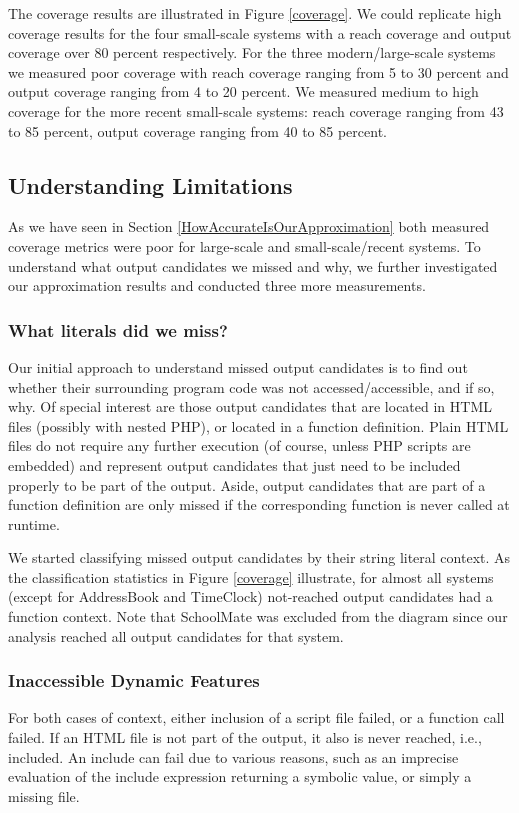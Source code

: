 \documentclass[sigconf]{acmart}
\begin{document}
The coverage results are illustrated in Figure \ref{coverage}. We could
replicate high coverage results for the four small-scale systems with a reach
coverage and output coverage over 80 percent respectively. For the three
modern/large-scale systems we measured poor coverage with reach coverage
ranging from 5 to 30 percent and output coverage ranging from 4 to 20 percent.
We measured medium to high coverage for the more recent small-scale systems:
reach coverage ranging from 43 to 85 percent, output coverage ranging from 40
to 85 percent.

\subsection{Understanding Limitations}
As we have seen in Section \ref{HowAccurateIsOurApproximation} both measured
coverage metrics were poor for large-scale and small-scale/recent systems. To
understand what output candidates we missed and why, we further investigated
our approximation results and conducted three more measurements.

\subsubsection{What literals did we miss?}\label{WhatLiteralsDidWeMiss?}
Our initial approach to understand missed output candidates is to find out
whether their surrounding program code was not accessed/accessible, and if so,
why. Of special interest are those output candidates that are located in HTML
files (possibly with nested PHP), or located in a function definition. Plain
HTML files do not require any further execution (of course, unless PHP scripts
are embedded) and represent output candidates that just need to be included
properly to be part of the output. Aside, output candidates that are part of a
function definition are only missed if the corresponding function is never
called at runtime.

We started classifying missed output candidates by their string literal
context. As the classification statistics in Figure \ref{coverage} illustrate,
for almost all systems (except for \textsf{AddressBook} and \textsf{TimeClock})
not-reached output candidates had a function context. Note that
\textsf{SchoolMate} was excluded from the diagram since our analysis reached
all output candidates for that system.

\subsubsection{Inaccessible Dynamic Features}
\label{sec:inaccessible}
For both cases of context, either inclusion of a script file failed, or a
function call failed. If an HTML file is not part of the output, it also is
never reached, i.e., included. An include can fail due to various reasons, such
as an imprecise evaluation of the include expression returning a symbolic
value, or simply a missing file.
\end{document}
